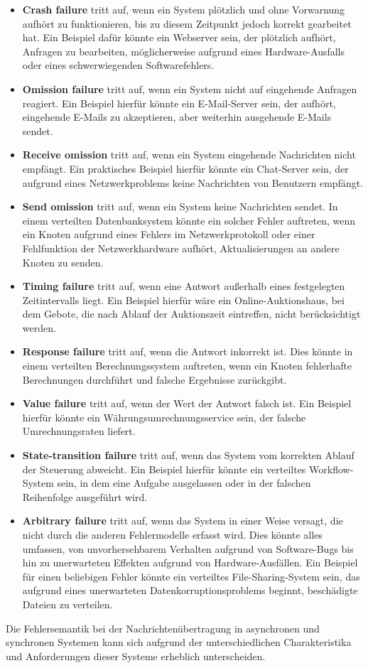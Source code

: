 \documentclass[../vs-script-first-v01.tex]{subfiles}
\begin{document}
\begin{itemize}
\item \textbf{Crash failure} tritt auf, wenn ein System plötzlich und ohne Vorwarnung aufhört zu funktionieren, bis zu diesem Zeitpunkt jedoch korrekt gearbeitet hat. Ein Beispiel dafür könnte ein Webserver sein, der plötzlich aufhört, Anfragen zu bearbeiten, möglicherweise aufgrund eines Hardware-Ausfalls oder eines schwerwiegenden Softwarefehlers.
\item \textbf{Omission failure} tritt auf, wenn ein System nicht auf eingehende Anfragen reagiert. Ein Beispiel hierfür könnte ein E-Mail-Server sein, der aufhört, eingehende E-Mails zu akzeptieren, aber weiterhin ausgehende E-Mails sendet.
\item  \textbf{Receive omission} tritt auf, wenn ein System eingehende Nachrichten nicht empfängt. Ein praktisches Beispiel hierfür könnte ein Chat-Server sein, der aufgrund eines Netzwerkproblems keine Nachrichten von Benutzern empfängt.
\item \textbf{Send omission} tritt auf, wenn ein System keine Nachrichten sendet. In einem verteilten Datenbanksystem könnte ein solcher Fehler auftreten, wenn ein Knoten aufgrund eines Fehlers im Netzwerkprotokoll oder einer Fehlfunktion der Netzwerkhardware aufhört, Aktualisierungen an andere Knoten zu senden.
\item \textbf{Timing failure}  tritt auf, wenn eine Antwort außerhalb eines festgelegten Zeitintervalls liegt. Ein Beispiel hierfür wäre ein Online-Auktionshaus, bei dem Gebote, die nach Ablauf der Auktionszeit eintreffen, nicht berücksichtigt werden.
\item \textbf{Response failure} tritt auf, wenn die Antwort inkorrekt ist. Dies könnte in einem verteilten Berechnungssystem auftreten, wenn ein Knoten fehlerhafte Berechnungen durchführt und falsche Ergebnisse zurückgibt.
\item \textbf{Value failure}  tritt auf, wenn der Wert der Antwort falsch ist. Ein Beispiel hierfür könnte ein Währungsumrechnungsservice sein, der falsche Umrechnungsraten liefert.
\item \textbf{State-transition failure} tritt auf, wenn das System vom korrekten Ablauf der Steuerung abweicht. Ein Beispiel hierfür könnte ein verteiltes Workflow-System sein, in dem eine Aufgabe ausgelassen oder in der falschen Reihenfolge ausgeführt wird.
\item \textbf{Arbitrary failure} tritt auf, wenn das System in einer Weise versagt, die nicht durch die anderen Fehlermodelle erfasst wird. Dies könnte alles umfassen, von unvorhersehbarem Verhalten aufgrund von Software-Bugs bis hin zu unerwarteten Effekten aufgrund von Hardware-Ausfällen. Ein Beispiel für einen beliebigen Fehler könnte ein verteiltes File-Sharing-System sein, das aufgrund eines unerwarteten Datenkorruptionsproblems beginnt, beschädigte Dateien zu verteilen.
\end{itemize}
Die Fehlersemantik bei der Nachrichtenübertragung in asynchronen und synchronen Systemen kann sich aufgrund der unterschiedlichen Charakteristika und Anforderungen dieser Systeme erheblich unterscheiden.
\end{document}
